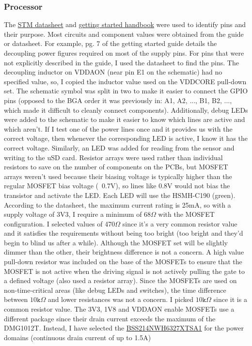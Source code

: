 \documentclass[10pt]{article}
\newcommand{\nl}{\newline \newline}
\begin{document}
\subsubsection{Processor}\label{sec:schematic-processor}
The \href{https://www.st.com/resource/en/datasheet/stm32n657a0.pdf}{STM datasheet} and \href{https://www.st.com/resource/en/application_note/an5967-getting-started-with-hardware-development-for-stm32n6-mcus-stmicroelectronics.pdf}{getting started handbook} were used to identify pins and their purpose. Most circuits and component values were obtained from the guide or datasheet.
For example, pg. 7 of the getting started guide details the decoupling power figures required on most of the supply pins. For pins that were not explicitly described in the guide, I used the datasheet to find the pins. The decoupling inductor on VDDAON (near pin E1 on the schematic) had no specified value, so, I copied the inductor value used on the VDDCORE pull-down set.
The schematic symbol was split in two to make it easier to connect the GPIO pins (opposed to the BGA order it was previously in: A1, A2, ..., B1, B2, ..., which made it difficult to cleanly connect components).
\nl
Additionally, debug LEDs were added to the schematic to make it easier to know which lines are active and which aren't. If I test one of the power lines once and it provides us with the correct voltage, then whenever the corresponding LED is active, I know it has the correct voltage.
Similarly, an LED was added for reading from the sensor and writing to the uSD card. Resistor arrays were used rather than individual resistors to save on the number of components on the PCBs, but MOSFET arrays weren't used because their biasing voltage is typically higher than the regular MOSFET bias voltage (~0.7V), so lines like 0.8V would not bias the transistor and activate the LED.
Each LED will use the HSMH-C190 (green). According to the datasheet, the maximum current rating is 25mA, so with a supply voltage of 3V3, I require a minimum of 68$\Omega$ with the MOSFET configuration. I selected values of 470$\Omega$ since it's a very common resistor value and it satisfies the requirements without being too bright (too bright and they'd begin to blind us after a while).
Although the MOSFET set will be slightly dimmer than the other, their brightness difference is not a concern.
A high value pull-down resistor was included on the base of the MOSFETs to ensure that the MOSFET is not active when the driving signal is not actively pulling the gate to a defined voltage (also used a resistor array). Since the MOSFETs are used on non-time-critical areas (like debug LEDs and switches), the time difference between $10\texttt{k}\Omega$ and lower resistances was not a concern. I picked $10\texttt{k}\Omega$ since it is a common resistor value.
\nl
The 3V3, 1V8 and VDDAON enable MOSFETs use a different package since their drain current exceeds the maximum of the DMG1012T. Instead, I have selected the \href{https://au.mouser.com/ProductDetail/Infineon-Technologies/BSS214NWH6327XTSA1?qs=Dj8dEyEphkMe%252Bfnz0ZE2og%3D%3D}{BSS214NWH6327XTSA1} for the power domains (continuous drain current of up to 1.5A)
\end{document}

